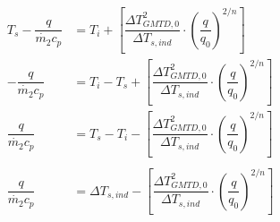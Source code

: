 \begin{equation}
	\begin{aligned}
		T_s -\dfrac{q}{\dot{m_2} c_p} &= T_i + \left[\dfrac{\Delta T_{GMTD,0}^2}{\Delta T_{s,ind}} \cdot \left(\dfrac{q}{q_0}\right)^{2/n}\right] \\
		-\dfrac{q}{\dot{m_2} c_p} &= T_i - T_s + \left[\dfrac{\Delta T_{GMTD,0}^2}{\Delta T_{s,ind}} \cdot \left(\dfrac{q}{q_0}\right)^{2/n}\right]  \\
		\dfrac{q}{\dot{m_2} c_p} &= T_s - T_i - \left[\dfrac{\Delta T_{GMTD,0}^2}{\Delta T_{s,ind}} \cdot \left(\dfrac{q}{q_0}\right)^{2/n}\right]  \\
		\\
		\dfrac{q}{\dot{m_2} c_p} &= \Delta T_{s,ind} - \left[\dfrac{\Delta T_{GMTD,0}^2}{\Delta T_{s,ind}} \cdot \left(\dfrac{q}{q_0}\right)^{2/n}\right]  \\
	\end{aligned}
	\label{eq:PPGMTD}
\end{equation}

